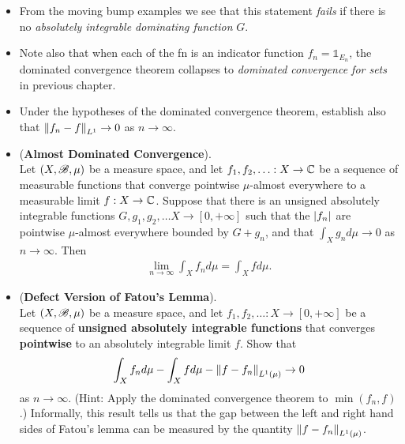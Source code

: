 \documentclass[11pt]{article}
\begin{document}
\begin{itemize}
\item \begin{remark}
From the moving bump examples we see that this statement \emph{fails} if there is no \emph{absolutely integrable dominating function} $G$. 
\end{remark}

\item \begin{remark}
Note also that when each of the fn is an indicator function $f_n= \mathds{1}_{E_n}$, the dominated convergence theorem collapses to \emph{dominated convergence for sets} in previous chapter.
\end{remark}

\item \begin{exercise}
Under the hypotheses of the dominated convergence theorem, establish also that $\left\|f_n - f\right\|_{L^1} \rightarrow 0$ as $n \rightarrow \infty$.
\end{exercise}

\item \begin{proposition} (\textbf{Almost Dominated Convergence}). \\
Let $(X, {\mathscr B}, \mu)$ be a measure space, and let $f_1, f_2, \ldots: X \rightarrow {\mathbb C}$ be a sequence of measurable functions that converge pointwise $\mu$-almost everywhere to a measurable limit $f : X \rightarrow {\mathbb C}$. Suppose that there is an unsigned absolutely integrable functions $G, g_1, g_2, \ldots X \rightarrow [0, +\infty]$ such that the $\left\lvert f_n \right\rvert$ are pointwise $\mu$-almost everywhere bounded by $G + g_n$, and that $\int_X g_n d\mu \rightarrow 0$ as $n \rightarrow \infty$. Then
\begin{align*}
\lim\limits_{n\rightarrow \infty} \int_X f_n d\mu = \int_X f d\mu.
\end{align*}
\end{proposition}

\item \begin{exercise}  (\textbf{Defect Version of Fatou's Lemma}). \\
Let $(X, {\mathscr B}, \mu)$ be a measure space, and let $f_1, f_2, \ldots: X \rightarrow [0, +\infty]$ be a sequence of \textbf{unsigned absolutely integrable functions} that converges \textbf{pointwise} to an absolutely integrable limit $f$. Show that
\begin{align*}
\int_X f_n d\mu - \int_X f d\mu - \left\|f - f_n\right\|_{L^1(\mu)} \rightarrow 0
\end{align*} as $n \rightarrow \infty$. (Hint: Apply the dominated convergence theorem to $\min(f_n, f)$.) Informally, this result tells us that the gap between the left and right hand sides of Fatou’s lemma can be measured by the quantity $\left\|f - f_n\right\|_{L^1(\mu)}$.
\end{exercise}


\end{itemize}
\end{document}
